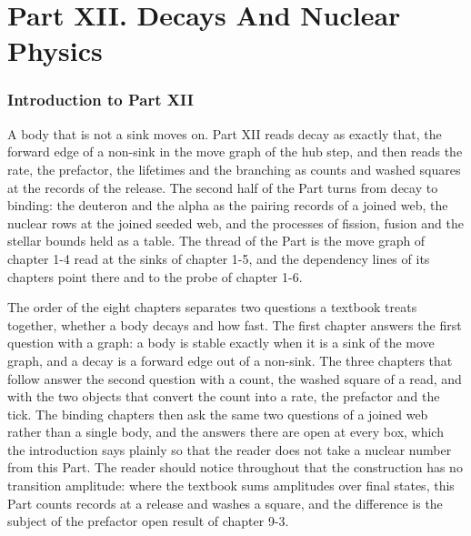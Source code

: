 \clearpage
\part*{Part XII. Decays And Nuclear Physics}
\label{atlaspart:12-decays-and-nuclei}
\section*{Introduction to Part XII}\label{narr:part:IX}
A body that is not a sink moves on. Part XII reads decay as exactly that, the forward edge of a non-sink in the move graph of the hub step, and then reads the rate, the prefactor, the lifetimes and the branching as counts and washed squares at the records of the release. The second half of the Part turns from decay to binding: the deuteron and the alpha as the pairing records of a joined web, the nuclear rows at the joined seeded web, and the processes of fission, fusion and the stellar bounds held as a table. The thread of the Part is the move graph of chapter 1-4 read at the sinks of chapter 1-5, and the dependency lines of its chapters point there and to the probe of chapter 1-6.

The order of the eight chapters separates two questions a textbook treats together, whether a body decays and how fast. The first chapter answers the first question with a graph: a body is stable exactly when it is a sink of the move graph, and a decay is a forward edge out of a non-sink. The three chapters that follow answer the second question with a count, the washed square of a read, and with the two objects that convert the count into a rate, the prefactor and the tick. The binding chapters then ask the same two questions of a joined web rather than a single body, and the answers there are open at every box, which the introduction says plainly so that the reader does not take a nuclear number from this Part. The reader should notice throughout that the construction has no transition amplitude: where the textbook sums amplitudes over final states, this Part counts records at a release and washes a square, and the difference is the subject of the prefactor open result of chapter 9-3.

